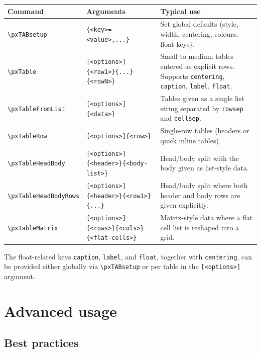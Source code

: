 \documentclass[11pt,a4paper]{article}
\begin{document}
\begin{center}
\begin{tabular}{llp{.45\linewidth}}
\textbf{Command} & \textbf{Arguments} & \textbf{Typical use}\\\hline
\verb|\pxTABsetup| & \verb|{<key>=<value>,...}| &
  Set global defaults (style, width, centering, colours, float keys).\\
\verb|\pxTable| &
  \verb|[<options>]{<row1>}{...}{<rowN>}| &
  Small to medium tables entered as explicit rows.  Supports
  \texttt{centering}, \texttt{caption}, \texttt{label}, \texttt{float}.\\
\verb|\pxTableFromList| &
  \verb|[<options>]{<data>}| &
  Tables given as a single list string separated by \texttt{rowsep} and
  \texttt{cellsep}.\\
\verb|\pxTableRow| &
  \verb|[<options>]{<row>}| &
  Single-row tables (headers or quick inline tables).\\
\verb|\pxTableHeadBody| &
  \verb|[<options>]{<header>}{<body-list>}| &
  Head/body split with the body given as list-style data.\\
\verb|\pxTableHeadBodyRows| &
  \verb|[<options>]{<header>}{<row1>}{...}| &
  Head/body split where both header and body rows are given explicitly.\\
\verb|\pxTableMatrix| &
  \verb|[<options>]{<rows>}{<cols>}{<flat-cells>}| &
  Matrix-style data where a flat cell list is reshaped into a grid.\\
\end{tabular}
\end{center}

The float-related keys \texttt{caption}, \texttt{label}, and
\texttt{float}, together with \texttt{centering}, can be provided either
globally via \verb|\pxTABsetup| or per table in the \verb|[<options>]|
argument.

\section{Advanced usage}

\subsection{Best practices}
\end{document}
